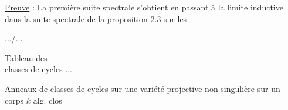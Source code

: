 \uline{Preuve} : La première suite spectrale s'obtient en passant à la limite inductive dans la suite spectrale de la proposition 2.3 sur les

\hfill .../...

\begin{flushright}
Tableau des\\
classes de cycles ...
\end{flushright}

Anneaux de classes de cycles sur une variété projective non singulière sur un corps $k$ alg. clos


